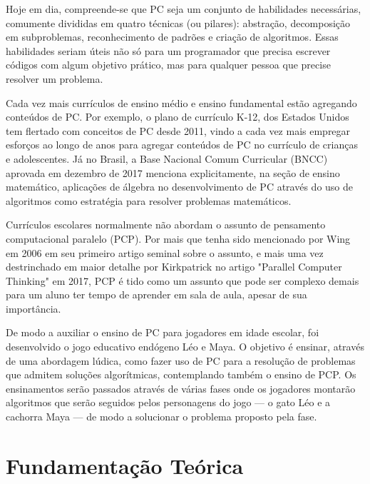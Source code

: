 \documentclass[conference]{IEEEtran}
\newcommand{\xexeo}[1]{\ednote{\textcolor{red}{Xexéo - #1}}}
\begin{document}
Hoje em dia, compreende-se que PC seja um conjunto de habilidades necessárias, comumente divididas em quatro técnicas (ou pilares): abstração, decomposição em subproblemas, reconhecimento de padrões e criação de algoritmos\cite{b3}. Essas habilidades seriam úteis não só para um programador que precisa escrever códigos com algum objetivo prático, mas para qualquer pessoa que precise resolver um problema.

Cada vez mais currículos de ensino médio e ensino fundamental estão agregando conteúdos de PC. Por exemplo, o plano de currículo K-12, dos Estados Unidos tem flertado com conceitos de PC desde 2011\cite{b1}, vindo a cada vez mais empregar esforços ao longo de anos para agregar conteúdos de PC no currículo de crianças e adolescentes. Já no Brasil, a Base Nacional Comum Curricular (BNCC) aprovada em dezembro de 2017 menciona explicitamente, na seção de ensino matemático, aplicações de álgebra no desenvolvimento de PC através do uso de algoritmos como estratégia para resolver problemas matemáticos\cite{b4}.

Currículos escolares normalmente não abordam o assunto de pensamento computacional paralelo (PCP). Por mais que tenha sido mencionado por Wing em 2006 em seu primeiro artigo seminal sobre o assunto, e mais uma vez destrinchado em maior detalhe por Kirkpatrick no artigo "Parallel Computer Thinking" em 2017, PCP é tido como um assunto que pode ser complexo demais para um aluno ter tempo de aprender em sala de aula, apesar de sua importância\cite{b5}\xexeo{Não só? Falto o como ...}. 

De modo a auxiliar o ensino de PC para jogadores em idade escolar,  foi desenvolvido o jogo educativo endógeno Léo e Maya\xexeo{- isso não pode aparecer - e nem se fala isso - os alunos Horácio Macêdo e Júlio Rama do curso de Bacharelado de Ciência da Computação desenvolveram o jogo educativo endógeno Léo \& Maya}.  O objetivo é ensinar, através de uma abordagem lúdica, como fazer uso de PC para a resolução de problemas que admitem soluções algorítmicas, contemplando também o ensino de PCP. Os ensinamentos serão passados através de várias fases onde os jogadores montarão algoritmos que serão seguidos pelos personagens do jogo — o gato Léo e a cachorra Maya — de modo a solucionar o problema proposto pela fase.\xexeo{Os personagens não exige, reconstruir com algo como ``onde os jogadores devem montar algoritmos para serem seguidos por dois personagens, ...}

\section{Fundamentação Teórica}
\end{document}
